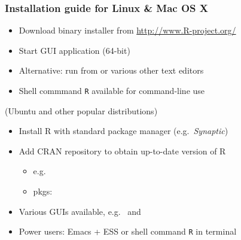 \documentclass[t]{beamer} %
\begin{document}
\begin{frame}
  \frametitle{Installation guide for Linux \& Mac OS X}

  \begin{itemize}
  \item Download binary installer from \url{http://www.R-project.org/}
  \item Start GUI application  (64-bit)
  \item Alternative: run from  or various other text editors
  \item Shell commmand \texttt{R} available for command-line use
  \end{itemize}

  \gap
   (Ubuntu and other popular distributions)
  \begin{itemize}
  \item Install R with standard package manager (e.g.\ \emph{Synaptic})
  \item Add CRAN repository to obtain up-to-date version of R
    \begin{itemize}
    \item e.g.\ 
    \item pkgs: 
    \end{itemize}
  \item Various GUIs available, e.g.\  and 
  \item Power users: Emacs + ESS or shell command \texttt{R} in terminal
  \end{itemize}
\end{frame}
\end{document}

